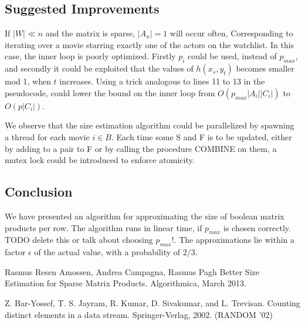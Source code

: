 \documentclass[a4paper,11pt]{article}
\begin{document}



\subsection{Suggested Improvements}
If $|W|\ll n$ and the matrix is sparse, $|A_{\pi}|=1$ will occur often, Corresponding to iterating over a movie starring exactly one of the actors on the watchlist. In this case, the inner loop is poorly optimized. Firstly $p_i$ could be used, instead of $p_{max}$, and secondly it could be exploited that the values of $h(x_s, y_t)$ becomes smaller mod 1, when $t$ increases. Using a trick analogous to lines 11 to 13 in the pseudocode, could lower the bound on the inner loop from $O(p_{max}|A_i||C_i|)$ to $O(p|C_i|)$.

We observe that the size estimation algorithm could be parallelized by spawning a thread for each movie  $i \in B$. Each time some S and F is to be updated, either by adding to a pair to F or by calling the procedure COMBINE on them, a mutex lock could be introduced to enforce atomicity. 


\subsection{Conclusion}
We have presented an algorithm for approximating the size of boolean matrix products per row. The algorithm runs in linear time, if $p_{max}$ is chosen correctly. TODO delete this or talk about choosing $p_{max}$!. The approximations lie within a factor $\epsilon$ of the actual value, with a probability of $2/3$.

\newpage

\begin{thebibliography}{}

Rasmus Resen Amossen, Andrea Campagna, Rasmus Pagh
Better Size Estimation for Sparse Matrix Products. Algorithmica, March 2013.

Z. Bar-Yossef, T. S. Jayram, R. Kumar, D. Sivakumar, and L. Trevisan.
Counting distinct elements in a data stream. Springer-Verlag, 2002. (RANDOM '02)

\end{thebibliography}
\end{document}
